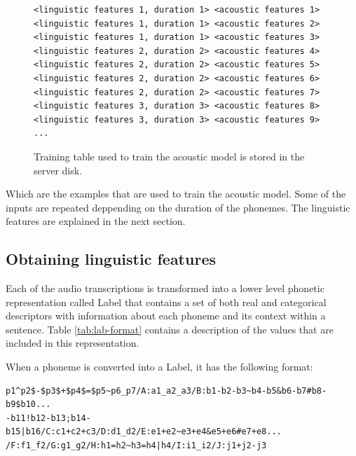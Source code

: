 \begin{figure}[h]
\begin{lstlisting}
<linguistic features 1, duration 1> <acoustic features 1>
<linguistic features 1, duration 1> <acoustic features 2>
<linguistic features 1, duration 1> <acoustic features 3>
<linguistic features 2, duration 2> <acoustic features 4>
<linguistic features 2, duration 2> <acoustic features 5>
<linguistic features 2, duration 2> <acoustic features 6>
<linguistic features 2, duration 2> <acoustic features 7>
<linguistic features 3, duration 3> <acoustic features 8>
<linguistic features 3, duration 3> <acoustic features 9>
...
\end{lstlisting}
\caption{Training table used to train the acoustic model is stored in the server disk.}
\end{figure}

Which are the examples that are used to train the acoustic model. Some of the inputs are repeated deppending on the duration of the phonemes. The linguistic features are explained in the next section. 

\subsection{Obtaining linguistic features}

Each of the audio transcriptions is transformed into a lower level phonetic representation called Label that contains a set of both real and categorical descriptors with information about each phoneme and its context within a sentence. Table \ref{tab:lab-format} contains a description of the values that are included in this representation.

When a phoneme is converted into a Label, it has the following format:

\begin{lstlisting}
p1^p2$-$p3$+$p4$=$p5~p6_p7/A:a1_a2_a3/B:b1-b2-b3~b4-b5&b6-b7#b8-b9$b10...
-b11!b12-b13;b14-b15|b16/C:c1+c2+c3/D:d1_d2/E:e1+e2~e3+e4&e5+e6#e7+e8...
/F:f1_f2/G:g1_g2/H:h1=h2~h3=h4|h4/I:i1_i2/J:j1+j2-j3
\end{lstlisting}

